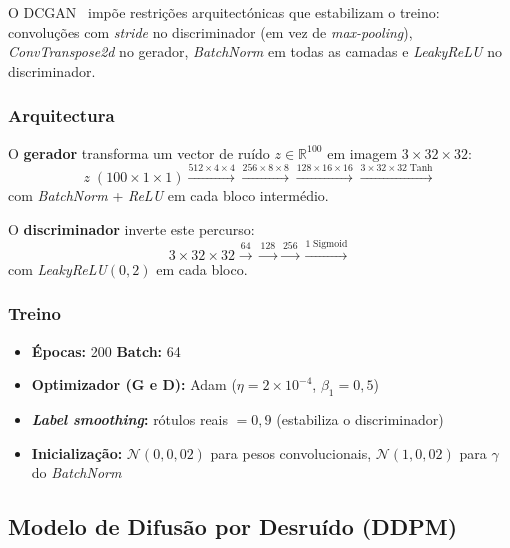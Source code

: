 \documentclass[12pt,a4paper]{article}
\begin{document}
O DCGAN~\cite{radford2015dcgan} impõe restrições arquitectónicas que estabilizam
o treino: convoluções com \textit{stride} no discriminador (em vez de
\textit{max-pooling}), \textit{ConvTranspose2d} no gerador,
\textit{BatchNorm} em todas as camadas e \textit{LeakyReLU} no discriminador.

\subsubsection*{Arquitectura}

O \textbf{gerador} transforma um vector de ruído
$z \in \mathbb{R}^{100}$ em imagem $3 \times 32 \times 32$:
\begin{equation*}
  z \;(100 \times 1 \times 1)
  \xrightarrow{512 \times 4 \times 4}
  \xrightarrow{256 \times 8 \times 8}
  \xrightarrow{128 \times 16 \times 16}
  \xrightarrow{3 \times 32 \times 32 \;\text{Tanh}}
\end{equation*}
com \textit{BatchNorm} + \textit{ReLU} em cada bloco intermédio.

O \textbf{discriminador} inverte este percurso:
\begin{equation*}
  3 \times 32 \times 32
  \xrightarrow{64}
  \xrightarrow{128}
  \xrightarrow{256}
  \xrightarrow{1 \;\text{Sigmoid}}
\end{equation*}
com \textit{LeakyReLU}$(0{,}2)$ em cada bloco.

\subsubsection*{Treino}

\begin{itemize}
  \item \textbf{Épocas:} 200 \quad \textbf{Batch:} 64
  \item \textbf{Optimizador (G e D):} Adam ($\eta = 2 \times 10^{-4}$, $\beta_1 = 0{,}5$)
  \item \textbf{\textit{Label smoothing}:} rótulos reais $= 0{,}9$ (estabiliza o discriminador)
  \item \textbf{Inicialização:} $\mathcal{N}(0, 0{,}02)$ para pesos convolucionais,
        $\mathcal{N}(1, 0{,}02)$ para $\gamma$ do \textit{BatchNorm}
\end{itemize}

\subsection{Modelo de Difusão por Desruído (DDPM)}
\end{document}
